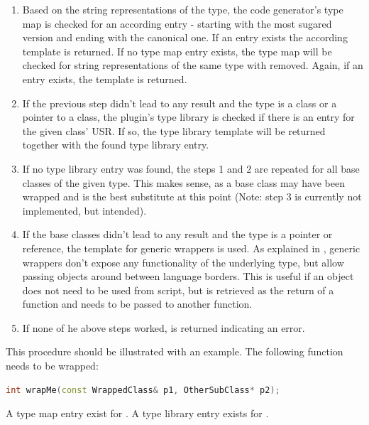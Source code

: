 \begin{enumerate}
\item Based on the string representations of the type, the code generator's type map is checked for an according entry - starting with the most sugared version and ending with the canonical one. If an entry exists the according template is returned. If no type map entry exists, the type map will be checked for string representations of the same type with  removed. Again, if an entry exists, the template is returned.
\item If the previous step didn't lead to any result and the type is a class or a pointer to a class, the plugin's type library is checked if there is an entry for the given class' USR. If so, the type library template will be returned together with the found type library entry.
\item If no type library entry was found, the steps 1 and 2 are repeated for all base classes of the given type. This makes sense, as a base class may have been wrapped and is the best substitute at this point (Note: step 3 is currently not implemented, but intended).
\item If the base classes didn't lead to any result and the type is a pointer or reference, the template for generic wrappers is used. As explained in , generic wrappers don't expose any functionality of the underlying type, but allow passing objects around between language borders. This is useful if an object does not need to be used from script, but is retrieved as the return of a  function and needs to be passed to another  function.
\item If none of he above steps worked,  is returned indicating an error.
\end{enumerate}

This procedure should be illustrated with an example. The following function needs to be wrapped:

\SingleSpacing
\begin{lstlisting}[language=C++, caption=Example function illustrating type resolution]
int wrapMe(const WrappedClass& p1, OtherSubClass* p2);
\end{lstlisting}
\OnehalfSpacing

A type map entry exist for . A type library entry exists for .

